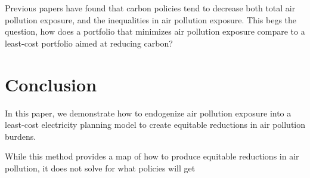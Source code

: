 \documentclass[a4paper]{article}
\theoremstyle{definition}
\theoremstyle{plain}
\begin{document}
Previous papers have found that carbon policies tend to decrease both total air pollution exposure, and the inequalities in air pollution exposure. This begs the question, how does a portfolio that minimizes air pollution exposure compare to a least-cost portfolio aimed at reducing carbon?

\section{Conclusion}
In this paper, we demonstrate how to endogenize air pollution exposure into a least-cost electricity planning model to create equitable reductions in air pollution burdens.    

While this method provides a map of how to produce equitable reductions in air pollution, it does not solve for what policies will get


\begin{singlespace}
\newpage

%

\end{singlespace}
\end{document}
